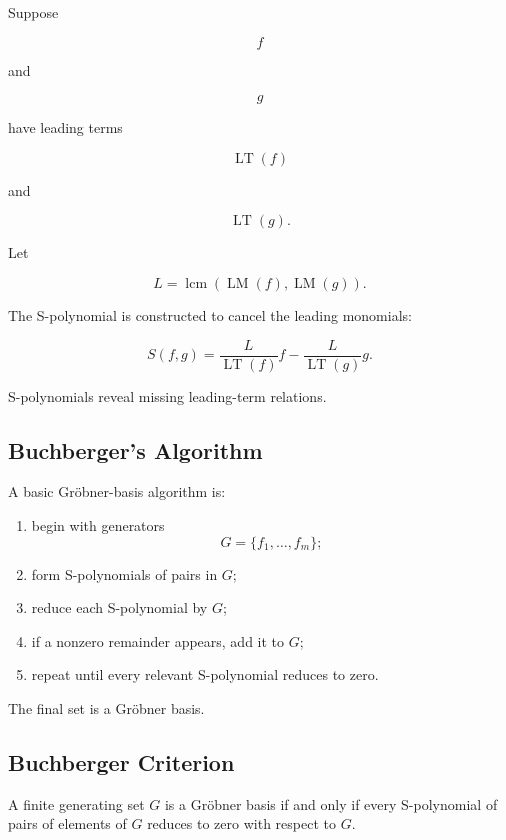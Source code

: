 Suppose

\[
f
\]

and

\[
g
\]

have leading terms

\[
\operatorname{LT}(f)
\]

and

\[
\operatorname{LT}(g).
\]

Let

\[
L
=
\operatorname{lcm}
(
\operatorname{LM}(f),
\operatorname{LM}(g)
).
\]

The S-polynomial is constructed to cancel the leading monomials:

\[
\boxed{
S(f,g)
=
\frac{
L
}{
\operatorname{LT}(f)
}
f
-
\frac{
L
}{
\operatorname{LT}(g)
}
g.
}
\]

S-polynomials reveal missing leading-term relations.

\subsection{Buchberger's Algorithm}
\label{subsec:buchberger-algorithm}

A basic Gröbner-basis algorithm is:

\begin{enumerate}
    \item begin with generators
    \[
    G=\{f_1,\ldots,f_m\};
    \]
    \item form S-polynomials of pairs in \(G\);
    \item reduce each S-polynomial by \(G\);
    \item if a nonzero remainder appears, add it to \(G\);
    \item repeat until every relevant S-polynomial reduces to zero.
\end{enumerate}

The final set is a Gröbner basis.

\subsection{Buchberger Criterion}
\label{subsec:buchberger-criterion}

A finite generating set \(G\) is a Gröbner basis if and only if every
S-polynomial of pairs of elements of \(G\) reduces to zero with respect to
\(G\).

